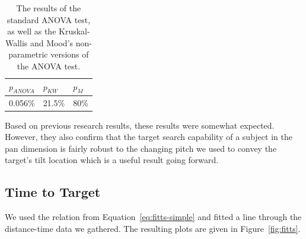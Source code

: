 \documentclass[format=sigconf, review=true, screen=true, anonymous=true]{acmart}
\begin{document}
\begin{table}
  \centering
  \caption{The results of the standard ANOVA test, as well as the Kruskal-Wallis and Mood's non-parametric versions of the ANOVA test.}
  \label{tab:tilt-stats}
  \begin{tabular}{|l|l|l|}
    \hline
    $p_{ANOVA}$ & $p_{KW}$ & $p_{M}$ \\\hline
    0.056\% & 21.5\% & 80\% \\\hline
  \end{tabular}
\end{table}

Based on previous research results, these results were somewhat expected. However, they also confirm that the target search capability of a subject in the pan dimension is fairly robust to the changing pitch we used to convey the target's tilt location which is a useful result going forward. %

\subsection{Time to Target}

We used the relation from Equation~\ref{eq:fitts-simple} and fitted a line through the distance-time data we gathered. The resulting plots are given in Figure~\ref{fig:fitts}.%
\end{document}
